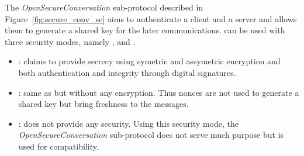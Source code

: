 \newcommand{\gereq}{GEReq}
\newcommand{\geres}{GERes}
\newcommand{\oscreq}{OSCReq}
\newcommand{\oscres}{OSCRes}


The {\em OpenSecureConversation} sub-protocol described in
Figure~\ref{fig:secure_conv_se} aims to authenticate a client and
a server and allows them to generate a shared key for the later communications.
\opcua can be used with three security modes, namely {\em \smn}, {\em \sms} and
{\em \smse}.

\begin{itemize}
    \item \smse: claims to provide secrecy using symetric and
      assymetric encryption and both authentication and integrity
      through digital signatures.
    \item \sms: same as {\em \smse} but without any encryption.  Thus
      nonces are not used to generate a shared key but bring freshness
      to the messages.
    \item \smn: does not provide any security.  Using this security
      mode, the {\em OpenSecureConversation} sub-protocol does not
      serve much purpose but is used for compatibility.
\end{itemize}

